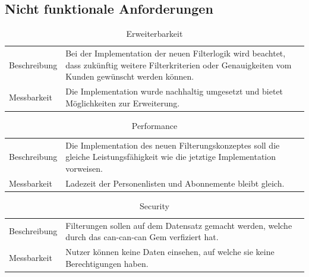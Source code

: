 \subsection{Nicht funktionale Anforderungen}

\begin{table}[h!]
   \begin{tabular}{|L{0.3\textwidth}|L{0.6\textwidth}|}
       \hline
         \\[4pt]
       \hline
       Beschreibung & Bei der Implementation der neuen Filterlogik wird beachtet, dass zukünftig weitere
       Filterkriterien oder Genauigkeiten vom Kunden gewünscht werden können. \\
       \hline
       Messbarkeit & Die Implementation wurde nachhaltig umgesetzt und bietet Möglichkeiten zur Erweiterung.  \\
       \hline
     \end{tabular}
     \caption{Erweiterbarkeit}
\end{table}

\begin{table}[h!]
   \begin{tabular}{|L{0.3\textwidth}|L{0.6\textwidth}|}
       \hline
         \\[4pt]
       \hline
       Beschreibung & Die Implementation des neuen Filterungskonzeptes soll die gleiche
       Leistungsfähigkeit wie die jetztige Implementation vorweisen. \\
       \hline
       Messbarkeit & Ladezeit der Personenlisten und Abonnemente bleibt gleich.  \\
       \hline
     \end{tabular}
     \caption{Performance}
\end{table}

\begin{table}[h!]
   \begin{tabular}{|L{0.3\textwidth}|L{0.6\textwidth}|}
       \hline
         \\[4pt]
       \hline
       Beschreibung & Filterungen sollen auf dem Datensatz gemacht werden, welche durch das can-can-can
       Gem verfiziert hat. \\
       \hline
       Messbarkeit & Nutzer können keine Daten einsehen, auf welche sie keine Berechtigungen haben.  \\
       \hline
     \end{tabular}
     \caption{Security}
\end{table}

